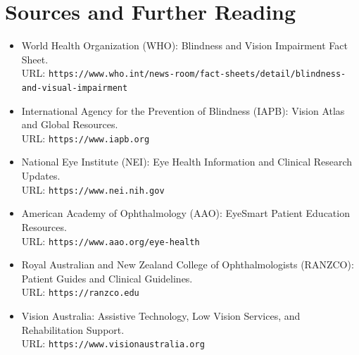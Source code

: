 \section*{Sources and Further Reading}
\begin{itemize}
    \item World Health Organization (WHO): Blindness and Vision Impairment Fact Sheet.\\
    URL: \texttt{https://www.who.int/news-room/fact-sheets/detail/blindness-and-visual-impairment}
    \item International Agency for the Prevention of Blindness (IAPB): Vision Atlas and Global Resources.\\
    URL: \texttt{https://www.iapb.org}
    \item National Eye Institute (NEI): Eye Health Information and Clinical Research Updates.\\
    URL: \texttt{https://www.nei.nih.gov}
    \item American Academy of Ophthalmology (AAO): EyeSmart Patient Education Resources.\\
    URL: \texttt{https://www.aao.org/eye-health}
    \item Royal Australian and New Zealand College of Ophthalmologists (RANZCO): Patient Guides and Clinical Guidelines.\\
    URL: \texttt{https://ranzco.edu}
    \item Vision Australia: Assistive Technology, Low Vision Services, and Rehabilitation Support.\\
    URL: \texttt{https://www.visionaustralia.org}
\end{itemize}